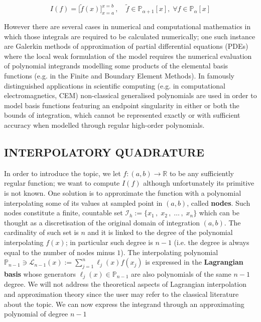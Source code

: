 \documentclass[a4paper, twosided]{book}
\begin{document}
\begin{equation}\label{eq1.2}
    I(f) = \Big[\tilde{f}(x)\Big]_{x=a}^{x=b}\,,\quad\tilde{f}\in\mathbb{P}_{\alpha+1}[x], \;\forall f\in\mathbb{P}_{\alpha}[x]
\end{equation}

\noindent
However there are several cases in numerical and computational mathematics in which those integrals are required to be calculated numerically; one such instance are Galerkin methods of approximation of partial differential equations (PDEs) where the local weak formulation of the model requires the numerical evaluation of polynomial integrands modelling some products of the elemental basis functions (e.g. in the Finite and Boundary Element Methods). In famously distinguished applications in scientific computing (e.g. in computational electromagnetics, CEM) non-classical generalised polynomials are used in order to model basis functions featuring an endpoint singularity in either or both the bounds of integration, which cannot be represented exactly or with sufficient accuracy when modelled through regular high-order polynomials.

\subsection[Interpolatory quadrature]{\changefont INTERPOLATORY QUADRATURE}\label{SubSec1.2.1}

In order to introduce the topic, we let $f:(a,b)\to\mathbb{R}$ to be any sufficiently regular function; we want to compute $I(f)$ although unfortunately its primitive is not known. One solution is to approximate the function with a polynomial interpolating some of its values at sampled point in $(a,b)$, called \color{poliDarkBlue} \textbf{nodes}\color{black}. Such nodes constitute a finite, countable set $\mathcal{I}_h:=\{x_1\,,\;x_2\,,\;\dots\,,\;x_{n}\}$ which can be thought as a discretisation of the original domain of integration $(a,b)$. The cardinality of such set is  $n$ and it is linked to the degree of the polynomial interpolating $f(x)$; in particular such degree is $n-1$ (i.e. the degree is always equal to the number of nodes minus $1$). The interpolating polynomial $\mathbb{P}_{n-1}\ni\mathcal{L}_{n-1}(x):=\sum_{j=1}^{n}\ell_j(x)f(x_j)$ is expressed in the \color{poliDarkBlue} \textbf{Lagrangian basis} \color{black} whose generators $\ell_j(x)\in\mathbb{P}_{n-1}$ are also polynomials of the same $n-1$ degree. We will not address the theoretical aspects of Lagrangian interpolation and approximation theory since the user may refer to the classical literature about the topic. We can now express the integrand through an approximating polynomial of degree $n-1$
\end{document}
